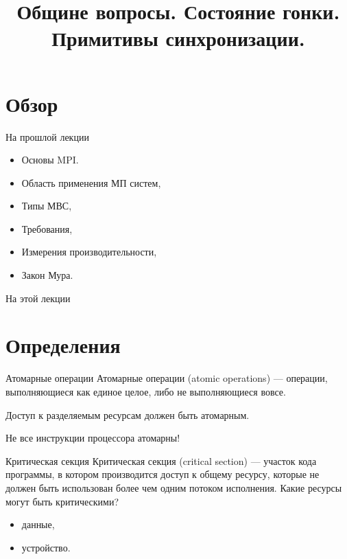 

\title{Общине вопросы. Состояние гонки. Примитивы синхронизации.}



\begin{frame}
\titlepage
\end{frame}

\section*{Обзор}
\begin{frame}{На прошлой лекции}

\begin{itemize}
\ifmipt
    \item Основы MPI.
\fi
\ifsbertech
    \item Область применения МП систем,
    \item Типы МВС,
    \item Требования,
    \item Измерения производительности,
    \item Закон Мура.
\fi
\end{itemize}
\end{frame}

\begin{frame}{На этой лекции}
\tableofcontents
\end{frame}

\section{Определения}

\begin{frame}{Атомарные операции}
Атомарные операции (\abbr atomic operations) --- операции, выполняющиеся как
единое целое, либо не выполняющиеся вовсе.
\vspace*{0.5cm}

Доступ к разделяемым ресурсам должен быть атомарным.
\vspace*{0.5cm}

Не все инструкции процессора атомарны!
\end{frame}

\begin{frame}{Критическая секция}
Критическая секция (\abbr critical section) --- участок кода программы, в
котором производится доступ к общему ресурсу, которые не должен быть использован
более чем одним потоком исполнения.
\vfill\pause
Какие ресурсы могут быть критическими?
\pause
\begin{itemize}
    \item данные,
    \pause
    \item устройство.
\end{itemize}
\end{frame}

